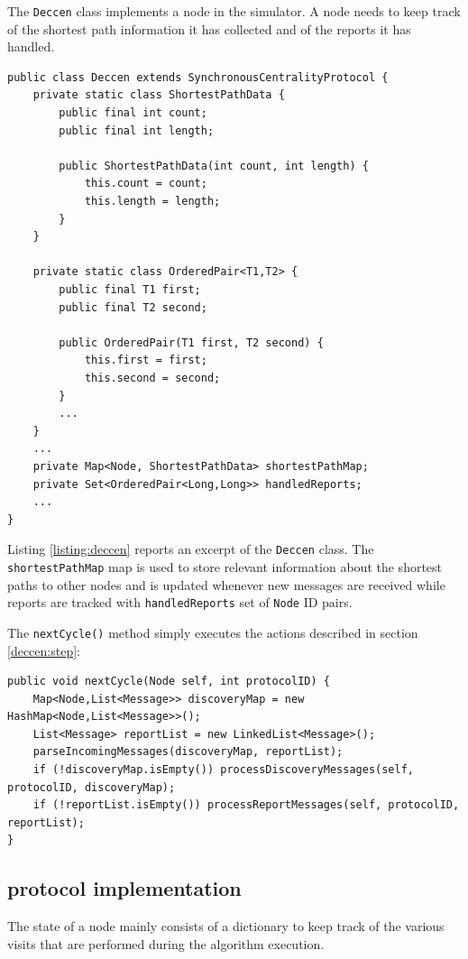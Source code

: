 The \texttt{Deccen} class implements a \deccen{} node in the simulator. A node needs to keep track of the shortest path information it has collected and of the reports it has handled.
\begin{verbatim}
public class Deccen extends SynchronousCentralityProtocol {
    private static class ShortestPathData {
        public final int count;
        public final int length;

        public ShortestPathData(int count, int length) {
            this.count = count;
            this.length = length;
        }
    }

    private static class OrderedPair<T1,T2> {
        public final T1 first;
        public final T2 second;

        public OrderedPair(T1 first, T2 second) {
            this.first = first;
            this.second = second;
        }
        ...
    }
    ...
    private Map<Node, ShortestPathData> shortestPathMap;
    private Set<OrderedPair<Long,Long>> handledReports;
    ...
}
\end{verbatim}
Listing \ref{listing:deccen} reports an excerpt of the \texttt{Deccen} class. The \texttt{shortestPathMap} map is used to store relevant information about the shortest paths to other nodes and is updated whenever new \mdisc{} messages are received while reports are tracked with \texttt{handledReports} set of \texttt{Node} ID pairs.

The \texttt{nextCycle()} method simply executes the actions described in section \ref{deccen:step}:
\begin{verbatim}
public void nextCycle(Node self, int protocolID) {
    Map<Node,List<Message>> discoveryMap = new HashMap<Node,List<Message>>();
    List<Message> reportList = new LinkedList<Message>();
    parseIncomingMessages(discoveryMap, reportList);
    if (!discoveryMap.isEmpty()) processDiscoveryMessages(self, protocolID, discoveryMap);
    if (!reportList.isEmpty()) processReportMessages(self, protocolID, reportList);
}
\end{verbatim}

\subsection*{\multibfs{} protocol implementation}

The state of a \multibfs{} node mainly consists of a dictionary to keep track of the various visits that are performed during the algorithm execution.

